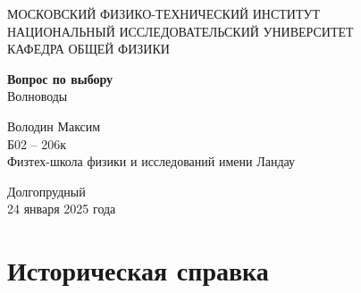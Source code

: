 \documentclass[a4paper, 14pt]{article}
\begin{document}
    \begin{titlepage}
        \begin{center}
        {\large МОСКОВСКИЙ ФИЗИКО-ТЕХНИЧЕСКИЙ ИНСТИТУТ \\ \vspace{5mm}
        НАЦИОНАЛЬНЫЙ ИССЛЕДОВАТЕЛЬСКИЙ УНИВЕРСИТЕТ \\ \vspace{5mm}
        КАФЕДРА ОБЩЕЙ ФИЗИКИ}
        \end{center}
        
        \begin{center}
        {\large}
        \end{center}
        
        \vspace{5cm}
        
        {\huge
            \begin{center}
            {\textbf{Вопрос по выбору}}
                \\
                Волноводы
            \end{center}
        }
        
        \vspace{2cm}
        
        \begin{flushright}
        {
            Володин Максим \\
            \vspace{2mm}
            Б02 -- 206к \\
            \vspace{2mm}
            Физтех-школа физики и исследований имени Ландау
        }
        \end{flushright}
        
        \tableofcontents \vspace{2.5cm}
        
        \begin{center}
            Долгопрудный \\
            24 января 2025 года
        \end{center}
    
    \end{titlepage}
    
    \section*{Историческая справка} 
    
\end{document}
